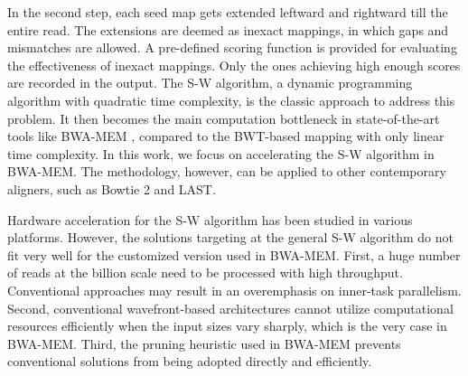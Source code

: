 In the second step, each seed map gets extended leftward and rightward till the entire read. 
The extensions are deemed as inexact mappings, in which gaps and mismatches are allowed. A pre-defined scoring function is provided for evaluating the effectiveness of inexact mappings. Only the ones achieving high enough scores are recorded in the output. 
The S-W algorithm, a dynamic programming algorithm with quadratic time complexity, is the classic approach to address this problem. 
It then becomes the main computation bottleneck in state-of-the-art tools like BWA-MEM \cite{BWA-MEM}, 
compared to the BWT-based mapping with only linear time complexity. 
In this work, we focus on accelerating the S-W algorithm in BWA-MEM. The methodology, however, can be applied to other contemporary aligners, such as Bowtie 2 and LAST. 

Hardware acceleration for the S-W algorithm has been studied in various platforms. 
However, the solutions targeting at the general S-W algorithm do not fit very well for the customized version used in BWA-MEM. 
First, a huge number of reads at the billion scale need to be processed with high throughput. 
Conventional approaches may result in an overemphasis on inner-task parallelism. 
Second, conventional wavefront-based architectures cannot utilize computational resources efficiently when the input sizes vary sharply, which is the very case in BWA-MEM. 
Third, the pruning heuristic used in BWA-MEM prevents conventional solutions from being adopted directly and efficiently.

